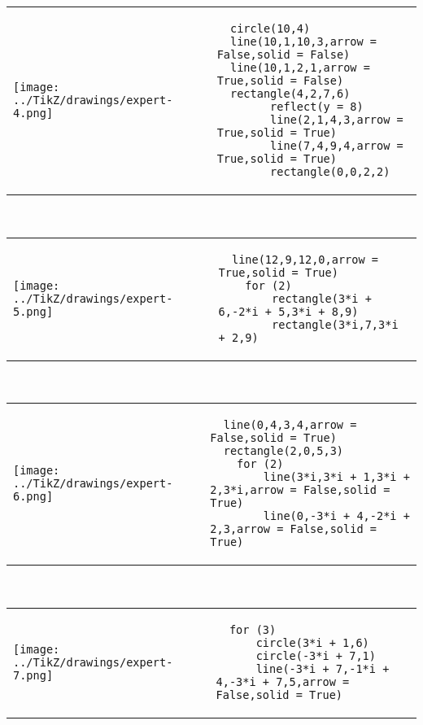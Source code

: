             \begin{tabular}{ll}
    \texttt{[image: ../TikZ/drawings/expert-4.png]}&
    
        \begin{minipage}{10cm}
        \begin{verbatim}
  circle(10,4)
  line(10,1,10,3,arrow = False,solid = False)
  line(10,1,2,1,arrow = True,solid = False)
  rectangle(4,2,7,6)
        reflect(y = 8)
        line(2,1,4,3,arrow = True,solid = True)
        line(7,4,9,4,arrow = True,solid = True)
        rectangle(0,0,2,2)
        \end{verbatim}
\end{minipage}

    \end{tabular}        
            \\

            \begin{tabular}{ll}
    \texttt{[image: ../TikZ/drawings/expert-5.png]}&
    
        \begin{minipage}{10cm}
        \begin{verbatim}
  line(12,9,12,0,arrow = True,solid = True)
    for (2)
        rectangle(3*i + 6,-2*i + 5,3*i + 8,9)
        rectangle(3*i,7,3*i + 2,9)
        \end{verbatim}
\end{minipage}

    \end{tabular}        
            \\

            \begin{tabular}{ll}
    \texttt{[image: ../TikZ/drawings/expert-6.png]}&
    
        \begin{minipage}{10cm}
        \begin{verbatim}
  line(0,4,3,4,arrow = False,solid = True)
  rectangle(2,0,5,3)
    for (2)
        line(3*i,3*i + 1,3*i + 2,3*i,arrow = False,solid = True)
        line(0,-3*i + 4,-2*i + 2,3,arrow = False,solid = True)
        \end{verbatim}
\end{minipage}

    \end{tabular}        
            \\

            \begin{tabular}{ll}
    \texttt{[image: ../TikZ/drawings/expert-7.png]}&
    
        \begin{minipage}{10cm}
        \begin{verbatim}
  for (3)
      circle(3*i + 1,6)
      circle(-3*i + 7,1)
      line(-3*i + 7,-1*i + 4,-3*i + 7,5,arrow = False,solid = True)
        \end{verbatim}
\end{minipage}

    \end{tabular}        
            \\

